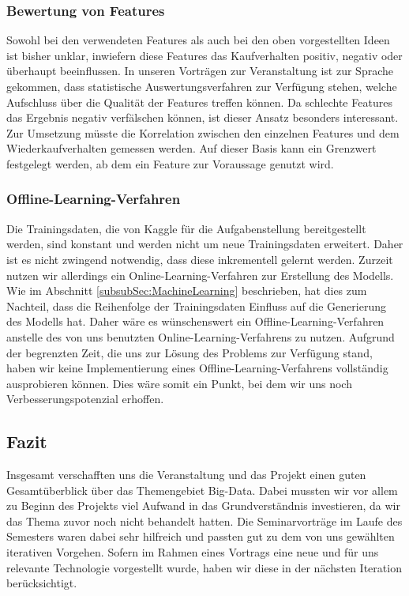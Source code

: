 \subsubsection{Bewertung von Features}	
Sowohl bei den verwendeten Features als auch bei den oben vorgestellten Ideen ist bisher unklar, inwiefern diese Features das Kaufverhalten positiv, negativ oder überhaupt beeinflussen.
In unseren Vorträgen zur Veranstaltung ist zur Sprache gekommen, dass statistische Auswertungsverfahren zur Verfügung stehen, welche Aufschluss über die Qualität der Features treffen können. Da schlechte Features das Ergebnis negativ verfälschen können, ist dieser Ansatz besonders interessant.
Zur Umsetzung müsste die Korrelation zwischen den einzelnen Features und dem Wiederkaufverhalten gemessen werden. Auf dieser Basis kann ein Grenzwert festgelegt werden, ab dem ein Feature
zur Voraussage genutzt wird.

\subsubsection{Offline-Learning-Verfahren}	
Die Trainingsdaten, die von Kaggle für die Aufgabenstellung bereitgestellt werden, sind konstant und werden 
nicht um neue Trainingsdaten erweitert.
Daher ist es nicht zwingend notwendig, dass diese inkrementell gelernt werden.
Zurzeit nutzen wir allerdings ein Online-Learning-Verfahren zur Erstellung des Modells.
Wie im Abschnitt \ref{subsubSec:MachineLearning} beschrieben, hat dies zum Nachteil,
dass die Reihenfolge der Trainingsdaten Einfluss auf die Generierung des Modells hat. 
Daher wäre es wünschenswert ein Offline-Learning-Verfahren anstelle des von uns benutzten Online-Learning-Verfahrens zu nutzen.
Aufgrund der begrenzten Zeit, die uns zur Lösung des Problems zur Verfügung stand, haben wir keine Implementierung eines Offline-Learning-Verfahrens vollständig ausprobieren können.
Dies wäre somit ein Punkt, bei dem wir uns noch Verbesserungspotenzial erhoffen.

\subsection{Fazit}
Insgesamt verschafften uns die Veranstaltung und das Projekt einen guten Gesamtüberblick über das Themengebiet Big-Data.
Dabei mussten wir vor allem zu Beginn des Projekts viel Aufwand in das Grundverständnis investieren, da wir das Thema zuvor noch nicht behandelt hatten.
Die Seminarvorträge im Laufe des Semesters waren dabei sehr hilfreich und passten gut zu dem von uns gewählten iterativen Vorgehen.
Sofern im Rahmen eines Vortrags eine neue und für uns relevante Technologie vorgestellt wurde, haben wir diese in der nächsten Iteration berücksichtigt.  

